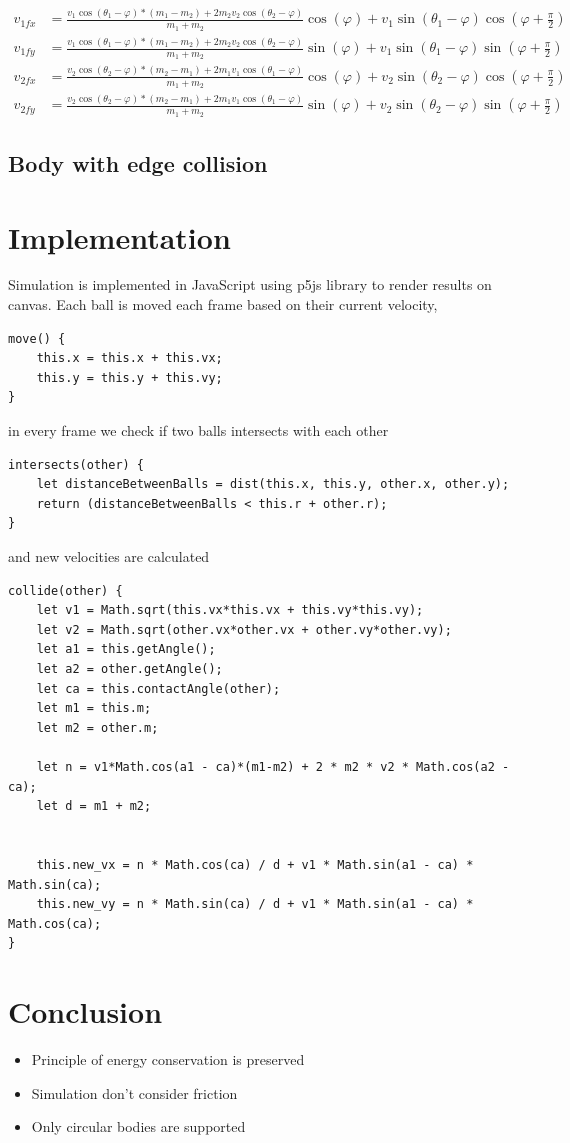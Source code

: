 \documentclass[]{report}
\begin{document}
\begin{equation}
\begin{aligned}
\label{eq:final_equation}
v_{1fx} &= \frac{v_1 \cos(\theta_1 - \varphi)*(m_1-m_2) + 2m_2 v_2 \cos(\theta_2 - \varphi)}{m_1+m_2} \cos(\varphi) + v_1 \sin(\theta_1 - \varphi) \cos(\varphi + \frac{\pi}{2}) \\
v_{1fy} &= \frac{v_1 \cos(\theta_1 - \varphi)*(m_1-m_2) + 2m_2 v_2 \cos(\theta_2 - \varphi)}{m_1+m_2} \sin(\varphi) + v_1 \sin(\theta_1 - \varphi) \sin(\varphi + \frac{\pi}{2}) \\
v_{2fx} &=\frac{v_2 \cos(\theta_2 - \varphi)*(m_2-m_1) + 2m_1 v_1 \cos(\theta_1 - \varphi)}{m_1+m_2} \cos(\varphi) + v_2 \sin(\theta_2 - \varphi) \cos(\varphi + \frac{\pi}{2}) \\
v_{2fy} &= \frac{v_2 \cos(\theta_2 - \varphi)*(m_2-m_1) + 2m_1 v_1 \cos(\theta_1 - \varphi)}{m_1+m_2} \sin(\varphi) + v_2 \sin(\theta_2 - \varphi) \sin(\varphi + \frac{\pi}{2}) 
\end{aligned}
\end{equation}
\subsection{Body with edge collision}
\section{Implementation}
Simulation is implemented in JavaScript using p5js library to render results on canvas. Each ball is moved each frame based on their current velocity,
\begin{lstlisting}
move() {
	this.x = this.x + this.vx;
	this.y = this.y + this.vy;
}
\end{lstlisting}
in every frame we check if two balls intersects with each other
\begin{lstlisting}
intersects(other) {
	let distanceBetweenBalls = dist(this.x, this.y, other.x, other.y);
	return (distanceBetweenBalls < this.r + other.r);
}
\end{lstlisting}
and new velocities are calculated
\begin{lstlisting}
collide(other) {
	let v1 = Math.sqrt(this.vx*this.vx + this.vy*this.vy);
	let v2 = Math.sqrt(other.vx*other.vx + other.vy*other.vy);
	let a1 = this.getAngle();
	let a2 = other.getAngle();
	let ca = this.contactAngle(other);
	let m1 = this.m;
	let m2 = other.m;
	
	let n = v1*Math.cos(a1 - ca)*(m1-m2) + 2 * m2 * v2 * Math.cos(a2 - ca);
	let d = m1 + m2;
	
	
	this.new_vx = n * Math.cos(ca) / d + v1 * Math.sin(a1 - ca) * Math.sin(ca);
	this.new_vy = n * Math.sin(ca) / d + v1 * Math.sin(a1 - ca) * Math.cos(ca);
}
\end{lstlisting}
\section{Conclusion}
\begin{itemize}
	\item Principle of energy conservation is preserved
	\item Simulation don't consider friction
	\item Only circular bodies are supported
\end{itemize}
\end{document}

